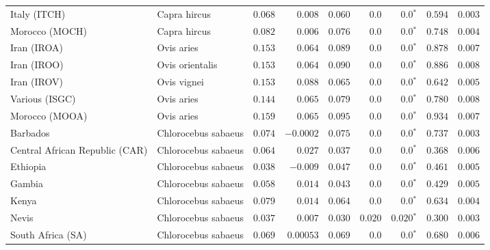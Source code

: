 \begin{center}
\begin{adjustbox}{width = 1\textwidth}
\begin{tabular}{|l|l|r|r|r|r|r|r|r|}
            Italy (ITCH)                    & Capra hircus          & $ 0.068$ & $ 0.008$  & $ 0.060$ & $0.0$    & $\bm{0.0{^*}}$    & $ 0.594$ & $ 0.003$ \\
            Morocco (MOCH)                    & Capra hircus     & $ 0.082$ & $ 0.006$  & $ 0.076$ & $0.0$    & $\bm{0.0{^*}}$    & $ 0.748$ & $ 0.004$ \\
            Iran (IROA)                    & Ovis aries         & $ 0.153$ & $ 0.064$  & $ 0.089$ & $0.0$    & $\bm{0.0{^*}}$    & $ 0.878$ & $ 0.007$ \\
            Iran (IROO)                 & Ovis orientalis          & $ 0.153$ & $ 0.064$  & $ 0.090$ & $0.0$    & $\bm{0.0{^*}}$    & $ 0.886$ & $ 0.008$ \\
            Iran (IROV)                 & Ovis vignei          & $ 0.153$ & $ 0.088$  & $ 0.065$ & $0.0$    & $\bm{0.0{^*}}$    & $ 0.642$ & $ 0.005$ \\
            Various (ISGC)                       & Ovis aries & $ 0.144$ & $ 0.065$ & $ 0.079$ & $0.0$    & $\bm{0.0{^*}}$    & $ 0.780$ & $ 0.008$ \\
            Morocco (MOOA) & Ovis aries & $ 0.159$ & $ 0.065$  & $ 0.095$ & $0.0$ & $\bm{0.0{^*}}$ & $ 0.934$ & $ 0.007$ \\
            Barbados                       & Chlorocebus sabaeus & $ 0.074$ & $-0.0002$  & $ 0.075$ & $0.0$    & $\bm{0.0{^*}}$    & $ 0.737$ & $ 0.003$ \\
            Central African Republic (CAR)                         & Chlorocebus sabaeus & $ 0.064$ & $ 0.027$  & $ 0.037$ & $0.0$    & $\bm{0.0{^*}}$    & $ 0.368$ & $ 0.006$ \\
            Ethiopia                          & Chlorocebus sabaeus & $ 0.038$ & $-0.009$  & $ 0.047$ & $0.0$    & $\bm{0.0{^*}}$    & $ 0.461$ & $ 0.005$ \\
            Gambia                          & Chlorocebus sabaeus & $ 0.058$ & $ 0.014$  & $ 0.043$ & $0.0$ & $\bm{0.0{^*}}$ & $ 0.429$ & $ 0.005$ \\
            Kenya              & Chlorocebus sabaeus & $ 0.079$ & $ 0.014$ & $ 0.064$ & $0.0$    & $\bm{0.0{^*}}$ & $ 0.634$ & $ 0.004$ \\
            Nevis               & Chlorocebus sabaeus & $ 0.037$ & $ 0.007$  & $ 0.030$ & $ 0.020$ & $\bm{ 0.020{^*}}$ & $ 0.300$ & $ 0.003$ \\
            South Africa (SA)                         & Chlorocebus sabaeus & $ 0.069$ & $0.00053$  & $ 0.069$ & $0.0$    & $\bm{0.0{^*}}$    & $ 0.680$ & $ 0.006$ \\

\end{tabular}
\end{adjustbox}
\end{center}
